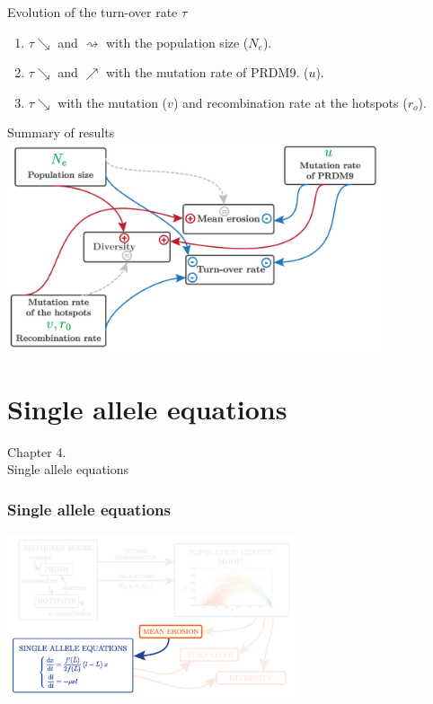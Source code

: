 \documentclass[10pt]{beamer}
\begin{document}
\begin{frame}
	\begin{center}
		\Large
    	Evolution of the turn-over rate $\tau$
	\end{center}
	\begin{enumerate}
		\item $\tau \searrow$ and $\rightsquigarrow$ with the population size ($N_e$).
			
		\item $\tau \searrow$ and $\nearrow$ with the mutation rate of PRDM9. ($u$).
		
		\item $\tau \searrow$ with the mutation ($v$) and recombination rate at the hotspots ($r_o$).
	\end{enumerate}
\end{frame}

\begin{frame}
	\begin{center}
		\Large
		Summary of results
       \includegraphics[width=11cm]{Images/summary.png}
	\end{center}
\end{frame}

\section{Single allele equations}

\begin{frame}
	\begin{center}
	\huge
	Chapter 4. \\
       Single allele equations
	\end{center}
\end{frame}

\begin{frame}
\frametitle{Single allele equations}
	\begin{center}
       \includegraphics[width=8.5cm]{Images/overline-4.png}
	\end{center}
\end{frame}
\end{document}
